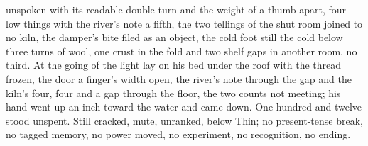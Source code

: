 \documentclass{design/chronicle}
\begin{document}
{\begin{itemize}[leftmargin=1.4em,itemsep=1pt,topsep=3pt,parsep=0pt]
unspoken with its readable double turn and the weight of a thumb apart, four low things with the river’s note a fifth, the two tellings of the shut room joined to no kiln, the damper’s bite filed as an object, the cold foot still the cold below three turns of wool, one crust in the fold and two shelf gaps in another room, no third. At the going of the light lay on his bed under the roof with the thread frozen, the door a finger’s width open, the river’s note through the gap and the kiln’s four, four and a gap through the floor, the two counts not meeting; his hand went up an inch toward the water and came down. One hundred and twelve stood unspent. Still cracked, mute, unranked, below Thin; no present-tense break, no tagged memory, no power moved, no experiment, no recognition, no ending.

\end{itemize}

\begin{itemize}[leftmargin=1.4em,itemsep=1pt,topsep=3pt,parsep=0pt]


\end{itemize}}
\end{document}

